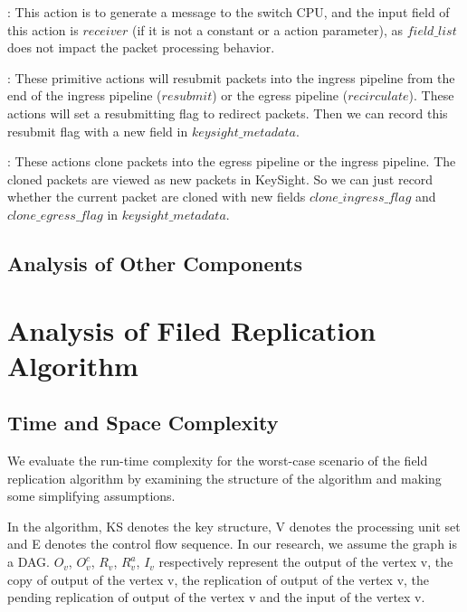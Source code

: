 : This action is to generate a message to the switch CPU, and the input field of this action is $receiver$ (if it is not a constant or a action parameter), as $field\_list$ does not impact the packet processing behavior.

 : These primitive actions will resubmit packets into the ingress pipeline from the end of the ingress pipeline ($resubmit$) or the egress pipeline ($recirculate$). These actions will set a resubmitting flag to redirect packets. Then we can record this resubmit flag with a new field in $keysight\_metadata$.

 : These actions clone packets into the egress pipeline or the ingress pipeline. The cloned packets are viewed as new packets in KeySight. So we can just record whether the current packet are cloned with new fields $clone\_ingress\_flag$ and $clone\_egress\_flag$ in $keysight\_metadata$.

\subsection{Analysis of Other Components}

\section{Analysis of Filed Replication Algorithm}





\subsection{Time and Space Complexity}
We evaluate the run-time complexity for the worst-case scenario of the field replication algorithm by examining the structure of the algorithm and making some simplifying assumptions.

In the algorithm, KS denotes the key structure, V denotes the processing unit set and E denotes the control flow sequence. In our research, we assume the graph is a DAG. $O_{v}$,  $O^{c}_{v}$, $R_{v}$, $R^{a}_{v}$, $I_{v}$ respectively represent the output of the vertex v, the copy of output of the vertex v, the replication of output of the vertex v, the pending replication of output of the vertex v and the input of the vertex v.

